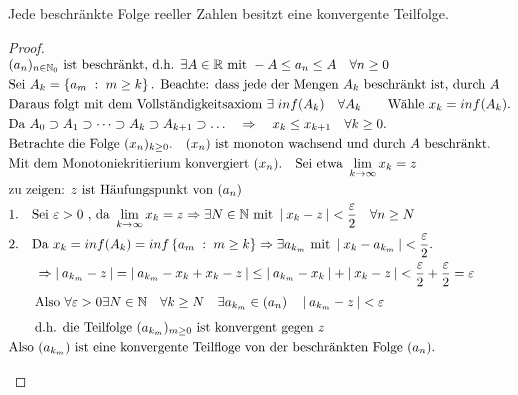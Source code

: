 \documentclass[a4paper,titlepage,oneside]{article}
\def\N{\ensuremath{\mathbb{N}} }
\def\R{\ensuremath{\mathbb{R}} }
\renewcommand{\epsilon}{\ensuremath{\varepsilon} }
\def\zz{\text{zu zeigen: }}
\def\sp{\hspace{0,1cm}}
\renewcommand{\liminf}[2][n]{\ensuremath{\lim\limits_{#1 \rightarrow \infty}{#2}}}
\newcommand{\abs}[1]{\ensuremath{\left|\:#1\:\right|}}
\newcommand{\menge}[2]{\ensuremath{\left\{#1\sp : \sp #2\right\}}}
\theoremstyle{thmstyle}
\begin{document}
\begin{subsatz}
Jede beschränkte Folge reeller Zahlen besitzt eine konvergente Teilfolge.
\begin{proof}
\begin{math} \displaystyle
\begin{aligned}[t]
&(a_n)_{n \in \N_0} \text{ ist beschränkt, d.h. }\exists A \in \R \text{ mit }-A \le a_n \le A \quad \forall n \ge 0\\
&\text{Sei } A_k = \menge{a_m}{m \ge k} \text{. Beachte: dass jede der Mengen } A_k \text{ beschränkt ist, durch }A\\
&\text{Daraus folgt mit dem Vollständigkeitsaxiom } \exists \sp inf(A_k) \quad \forall A_k \qquad \text{Wähle } x_k = inf(A_k). \\
&\text{Da } A_0 \supset A_1 \supset \dots \supset A_k \supset A_{k+1} \supset \dots \quad \Rightarrow \quad x_k \le x_{k+1} \quad \forall k \ge 0.\\
&\text{Betrachte die Folge }(x_n)_{k \ge 0}. \quad (x_n) \text{ ist monoton wachsend und durch $A$ beschränkt.}\\
&\text{Mit dem Monotoniekritierium konvergiert } (x_n). \quad \text{Sei etwa } \liminf[k]{x_k} = z\\
&\zz z \text{ ist Häufungspunkt von } (a_n) \\
&\begin{aligned}[t]
& 1. &&\text{Sei } \epsilon > 0 \text{ , da } \liminf[k]{x_k} = z \Rightarrow \exists N \in \N \text{ mit } \abs{x_k - z} < \frac{\epsilon}{2} \quad \forall n \ge N \\
& 2. &&\text{Da }x_k = inf(A_k) = inf\menge{a_m}{m \ge k} \Rightarrow \exists a_{k_m} \text{ mit } \abs{x_k - a_{k_m}} < \frac{\epsilon}{2}.
\end{aligned} \\ \vphantom{\frac{\epsilon}{2}}
&\qquad \Rightarrow \abs{a_{k_m} - z} = \abs{a_{k_m} - x_k + x_k - z} \le \abs{a_{k_m} - x_k} + \abs{x_k - z} < \frac{\epsilon}{2} + \frac{\epsilon}{2} = \epsilon  \\ \vphantom{\frac{\epsilon}{2}}
&\qquad \text{Also } \forall \epsilon > 0 \exists N \in \N \quad \forall k \ge N \quad \exists a_{k_m} \in (a_n) \quad \abs{a_{k_m} - z} < \epsilon  \\
&\qquad \text{d.h. die Teilfolge }(a_{k_m})_{m\ge 0}\text{ ist konvergent gegen } z \\
&\text{Also }(a_{k_m})\text{ ist eine konvergente Teilfloge von der beschränkten Folge }(a_n).
\end{aligned} \\
\end{math}
\begin{figure}[h!] \begin{center}  \end{center}\end{figure}
\end{proof}
\end{subsatz}
\end{document}
